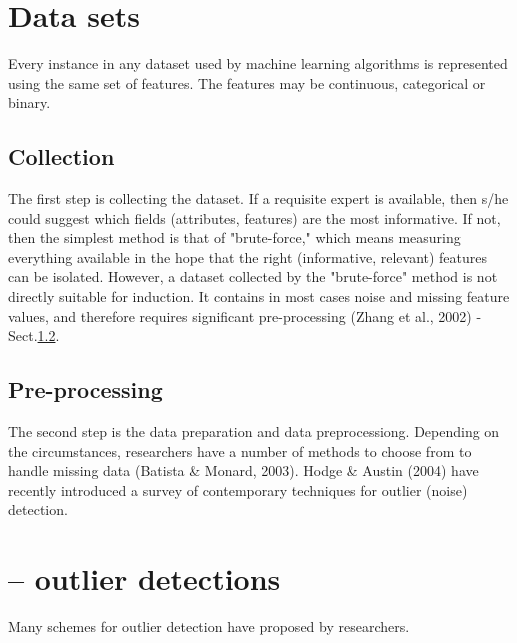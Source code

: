 \section{Data sets}

Every instance in any dataset used by machine learning algorithms is represented
using the same set of features. The features may be continuous, categorical or
binary.


\subsection{Collection}

The first step is collecting the dataset. If a requisite expert is available,
then s/he could suggest which fields (attributes, features) are the most
informative. If not, then the simplest method is that of "brute-force," which
means measuring everything available in the hope that the right (informative,
relevant) features can be isolated.
However, a dataset collected by the "brute-force" method is not directly
suitable for induction. It contains in most cases noise and missing feature
values, and therefore requires significant pre-processing (Zhang et al., 2002)
- Sect.\ref{sec:data-preprocessing}.

\subsection{Pre-processing}
\label{sec:data-preprocessing}	


The second step is the data preparation and data preprocessiong.
Depending on the circumstances, researchers have a number of methods to choose
from to handle missing data (Batista \& Monard, 2003). Hodge \& Austin (2004)
have recently introduced a survey of contemporary techniques for outlier (noise)
detection.
 
\section{-- outlier detections}

Many schemes for outlier detection
have proposed by researchers.

